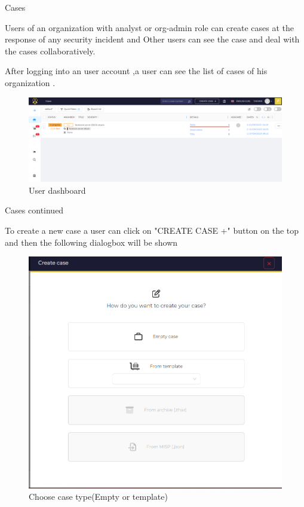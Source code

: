 \begin{frame}{Cases}
\begin{justify}

Users of an organization with analyst or org-admin role can create cases at the response of any security incident and Other users can see the case and deal with the cases collaboratively.

After logging into an user account ,a user can see the list of cases of his organization .
\begin{figure}[htp]
    \centering
    \includegraphics[scale = 0.28]{User_home_page.png}
    \caption{User dashboard}
    \label{User dashboard}
\end{figure}


\end{justify}

\end{frame}

\begin{frame}{Cases continued}

To create a new case a user can click on "CREATE CASE +" button on the top and then the following dialogbox will be shown
\begin{figure}[htp]
    \centering
    \includegraphics[scale = 0.28]{creating case(empty or template).png}
    \caption{Choose case type(Empty or template)}
    \label{Choose case type(Empty or template)}
\end{figure}
    
\end{frame}


